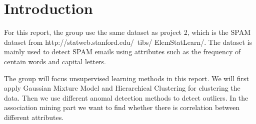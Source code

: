 \section{Introduction}
\label{sec:intro}

For this report, the group use the same dataset as project 2, which is the SPAM dataset from http://statweb.stanford.edu/~tibs/ ElemStatLearn/. The dataset is mainly used to detect SPAM emails using attributes such as the frequency of centain words and capital letters.

The group will focus unsupervised learning methods in this report. We will first apply Gaussian Mixture Model and Hierarchical Clustering for clustering the data. Then we use different anomal detection methods to detect outliers. In the association mining part we want to find whether there is correlation between different attributes.